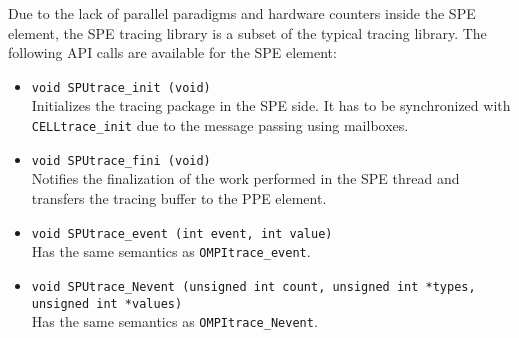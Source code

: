 Due to the lack of parallel paradigms and hardware counters inside the SPE element, the SPE tracing library is a subset of the typical tracing library. The following API calls are available for the SPE element:

\begin{itemize}

 \item {\tt void SPUtrace\_init (void)}\\
 Initializes the tracing package in the SPE side. It has to be synchronized with {\tt CELLtrace\_init} due to the message passing using mailboxes.

 \item {\tt void SPUtrace\_fini (void)}\\
 Notifies the finalization of the work performed in the SPE thread and transfers the tracing buffer to the PPE element.

 \item {\tt void SPUtrace\_event (int event, int value)}\\
 Has the same semantics as {\tt OMPItrace\_event}.

 \item {\tt void SPUtrace\_Nevent (unsigned int count, unsigned int *types, unsigned int *values)}\\
 Has the same semantics as {\tt OMPItrace\_Nevent}.

\end{itemize}

